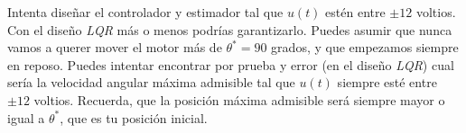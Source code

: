 \documentclass[11pt,a4paper,titlepage]{article}
\begin{document}
	Intenta diseñar el controlador y estimador tal que $u(t)$ estén entre $\pm 12$ voltios. Con el diseño \emph{LQR} más o menos podrías garantizarlo. Puedes asumir que nunca vamos a querer mover el motor más de $\theta^* = 90$ grados, y que empezamos siempre en reposo. Puedes intentar encontrar por prueba y error (en el diseño \emph{LQR}) cual sería la velocidad angular máxima admisible tal que $u(t)$ siempre esté entre $\pm 12$ voltios. Recuerda, que la posición máxima admisible será siempre mayor o igual a $\theta^*$, que es tu posición inicial.
\end{document}
